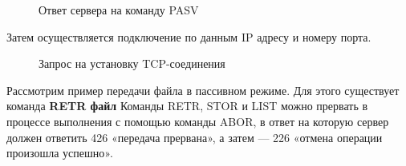 \documentclass[a4paper, 14pt,russian]{article}
\begin{document}
	\begin{figure}[h!]
		\caption{Ответ сервера на команду PASV}
		\label{img:ftp_scheme}
	\end{figure}
	
	Затем осуществляется подключение по данным IP адресу и номеру порта. 
	\begin{figure}[h!]
		\caption{Запрос на установку TCP-соединения}
		\label{img:ftp_scheme}
	\end{figure}
	
	Рассмотрим пример передачи файла в пассивном режиме. Для этого существует команда \textbf{RETR {файл}}
	Команды RETR, STOR и LIST можно прервать в процессе выполнения с помощью команды ABOR, в ответ на которую сервер должен ответить 426 «передача прервана», а затем — 226 «отмена операции произошла успешно».
	\newpage
	
\end{document}
